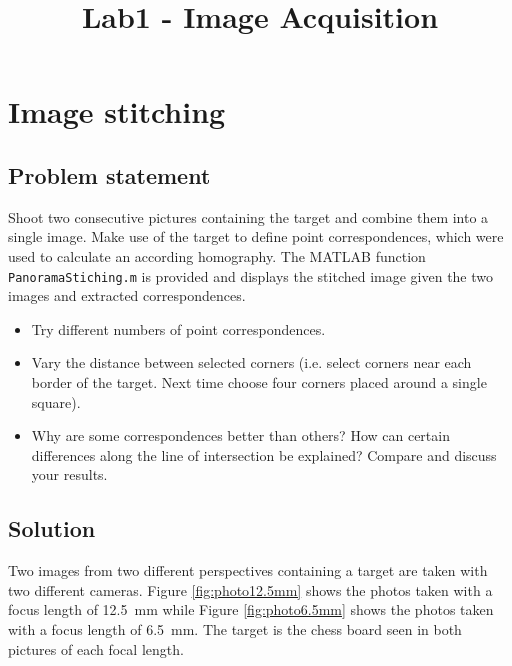 \documentclass[
a4paper,     %
11pt         %
]{scrartcl}  %
\title{Lab1 - Image Acquisition}
\begin{document}

 \maketitle

 \tableofcontents
 \newpage

\section{Image stitching}

\subsection{Problem statement}

Shoot two consecutive pictures containing the target and combine them into a single image. Make use of the
target to define point correspondences, which were used to calculate an according homography. The MATLAB
function \texttt{PanoramaStiching.m} is provided and displays the stitched image given the two images and extracted
correspondences.

\begin{itemize}
 \item Try different numbers of point correspondences.
 \item Vary the distance between selected corners (i.e. select corners near each border of the target. Next time choose four corners placed around a single square).
 \item Why are some correspondences better than others? How can certain differences along the line of intersection be explained? Compare and discuss your results.
\end{itemize}

\subsection{Solution}

Two images from two different perspectives containing a target are taken with two different cameras.
Figure \ref{fig:photo12.5mm} shows the photos taken with a focus length of \SI{12.5}{mm} while Figure \ref{fig:photo6.5mm} shows the photos taken with a focus length of \SI{6.5}{mm}.
The target is the chess board seen in both pictures of each focal length.
\end{document}
